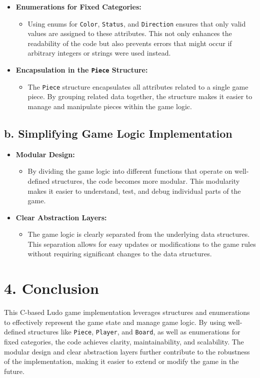 \documentclass[a4paper,12pt]{article}
\begin{document}
\begin{itemize}
    \item \textbf{Enumerations for Fixed Categories:}
    \begin{itemize}
        \item Using enums for \texttt{Color}, \texttt{Status}, and \texttt{Direction} ensures that only valid values are assigned to these attributes. This not only enhances the readability of the code but also prevents errors that might occur if arbitrary integers or strings were used instead.
    \end{itemize}

    \item \textbf{Encapsulation in the \texttt{Piece} Structure:}
    \begin{itemize}
        \item The \texttt{Piece} structure encapsulates all attributes related to a single game piece. By grouping related data together, the structure makes it easier to manage and manipulate pieces within the game logic.
    \end{itemize}
\end{itemize}

\subsection*{b. Simplifying Game Logic Implementation}

\begin{itemize}
    \item \textbf{Modular Design:}
    \begin{itemize}
        \item By dividing the game logic into different functions that operate on well-defined structures, the code becomes more modular. This modularity makes it easier to understand, test, and debug individual parts of the game.
    \end{itemize}

    \item \textbf{Clear Abstraction Layers:}
    \begin{itemize}
        \item The game logic is clearly separated from the underlying data structures. This separation allows for easy updates or modifications to the game rules without requiring significant changes to the data structures.
    \end{itemize}
\end{itemize}

\section*{4. Conclusion}

This C-based Ludo game implementation leverages structures and enumerations to effectively represent the game state and manage game logic. By using well-defined structures like \texttt{Piece}, \texttt{Player}, and \texttt{Board}, as well as enumerations for fixed categories, the code achieves clarity, maintainability, and scalability. The modular design and clear abstraction layers further contribute to the robustness of the implementation, making it easier to extend or modify the game in the future.
\end{document}
